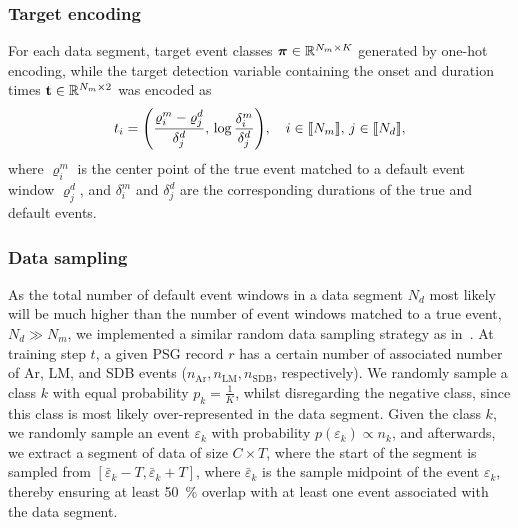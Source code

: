 \subsubsection{Target encoding}

For each data segment, target event classes \(\boldsymbol{\pi} \in \mathbb{R}^{N_m \times K}\) generated by one-hot encoding, while the target detection variable containing the onset and duration times \(\mathbf{t} \in \mathbb{R}^{N_m \times 2}\) was encoded as
\begin{equation}
    t_i = \parentheses*{\frac{\varrho^m_i - \varrho^d_j}{\delta^d_j}, \, \log \frac{\delta^m_i}{\delta^d_j}}, \quad i \in \bbrackets*{N_m}, \, j \in \bbrackets*{N_d},
\end{equation}
where \(\varrho^m_i\) is the center point of the true event matched to a default event window \(\varrho^d_j\), and \(\delta^m_i\) and \(\delta^d_j\) are the corresponding durations of the true and default events.

\subsubsection{Data sampling}
As the total number of default event windows in a data segment \( N_d \) most likely will be much higher than the number of event windows matched to a true event, \ie \( N_d \gg N_m\), we implemented a similar random data sampling strategy as in~\cite{Olesen2019}.
At training step \(t\), a given \ac{PSG} record \(r\) has a certain number of associated number of \ac{Ar}, \ac{LM}, and \ac{SDB} events (\(n_{\mathrm{Ar}},n_{\mathrm{LM}},n_{\mathrm{SDB}}\), respectively).
We randomly sample a class \(k\) with equal probability $p_k = \frac{1}{K}$, whilst disregarding the negative class, since this class is most likely over-represented in the data segment.
Given the class \(k\), we randomly sample an event \(\varepsilon_k\) with probability \(p(\varepsilon_k) \propto n_k\), and afterwards, we extract a segment of data of size \(C\times T\), where the start of the segment is sampled from \( \left[ \bar{\varepsilon}_k - T, \bar{\varepsilon}_k + T \right]\), where \( \bar{\varepsilon}_k \) is the sample midpoint of the event \( \varepsilon_{k} \), thereby ensuring at least \SI{50}{\percent} overlap with at least one event associated with the data segment.

